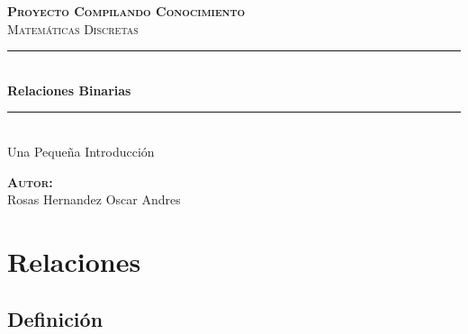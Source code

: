 \documentclass[12pt]{report}                                    %
\author{Oscar Andrés Rosas}                                     %
\begin{document}
\begin{titlepage}

	\center
	\textbf{\textsc{\Large Proyecto Compilando Conocimiento}}\\[1.0cm] 
	\textsc{\Large Matemáticas Discretas}\\[1.0cm] 

	\rule{\linewidth}{0.5mm} \\[1.0cm]
		{ \huge \bfseries Relaciones Binarias}\\[1.0cm] 
	\rule{\linewidth}{0.5mm} \\[2.0cm]
	
	{\LARGE Una Pequeña Introducción}\\[7cm] 
	
	\begin{center} \large
	\textbf{\textsc{Autor:}}\\
	Rosas Hernandez Oscar Andres
	\end{center}

	\vfill

\end{titlepage}

\tableofcontents{}
\label{sec:Index}

\clearpage










\chapter{Relaciones}
    \clearpage

    \section{Definición}
\end{document}
